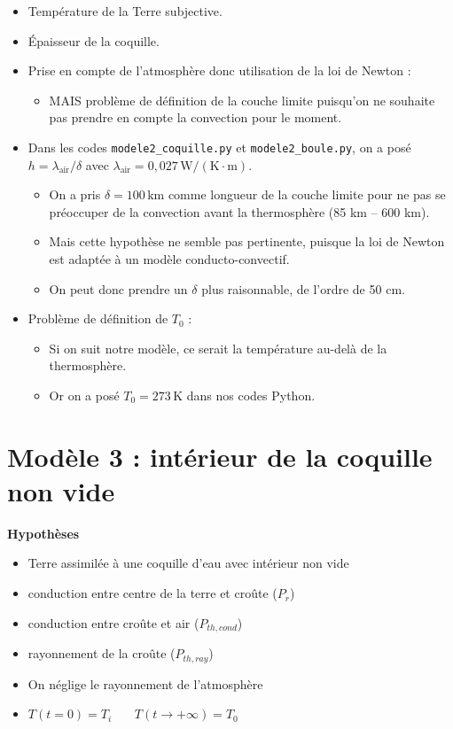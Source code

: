 \documentclass[a4paper,12pt]{article}
\begin{document}
\begin{itemize}
    \item Température de la Terre subjective.
    \item Épaisseur de la coquille.
    \item Prise en compte de l’atmosphère donc utilisation de la loi de Newton :
    \begin{itemize}
        \item MAIS problème de définition de la couche limite puisqu’on ne souhaite pas prendre en compte la convection pour le moment.
    \end{itemize}
    \item Dans les codes \texttt{modele2\_coquille.py} et \texttt{modele2\_boule.py}, on a posé $h = \lambda_{\text{air}} / \delta$ avec $\lambda_{\text{air}} = 0{,}027 \, \mathrm{W/(K \cdot m)}$.
    \begin{itemize}
        \item On a pris $\delta = 100\, \mathrm{km}$ comme longueur de la couche limite pour ne pas se préoccuper de la convection avant la thermosphère (85 km – 600 km).
        \item Mais cette hypothèse ne semble pas pertinente, puisque la loi de Newton est adaptée à un modèle conducto-convectif.
        \item On peut donc prendre un $\delta$ plus raisonnable, de l’ordre de 50 cm.
    \end{itemize}
    \item Problème de définition de $T_0$ :
    \begin{itemize}
        \item Si on suit notre modèle, ce serait la température au-delà de la thermosphère.
        \item Or on a posé $T_0 = 273\, \mathrm{K}$ dans nos codes Python.
    \end{itemize}
\end{itemize}

\newpage
\section{Modèle 3 : intérieur de la coquille non vide }
\textbf{Hypothèses}
\begin{itemize}
    \item Terre assimilée à une coquille d'eau avec intérieur non vide 
    \item  conduction entre centre de la terre et croûte (\(P_r\))
    \item  conduction entre croûte et air (\(P_{th,cond}\))
    \item  rayonnement de la croûte (\(P_{th,ray}\))
    \item On néglige le rayonnement de l'atmosphère
    \item $T(t=0) = T_i$ \ \ \
$T(t \to +\infty) = T_0$
     
\end{itemize}
\end{document}
